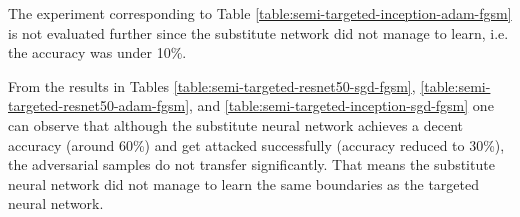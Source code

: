 \begin{table}[]
\caption{Substitute network: InceptionResNetV2 architecture with Adam optimizer; Attack: FGSM}
\label{table:semi-targeted-inception-adam-fgsm}
\end{table}

The experiment corresponding to Table \ref{table:semi-targeted-inception-adam-fgsm} is not evaluated further since the substitute network did not manage to learn, i.e. the accuracy was under 10\%. 

From the results in Tables \ref{table:semi-targeted-resnet50-sgd-fgsm},
\ref{table:semi-targeted-resnet50-adam-fgsm}, and 
\ref{table:semi-targeted-inception-sgd-fgsm} one can observe that although the substitute neural network achieves a decent accuracy (around 60\%) and get attacked successfully (accuracy reduced to 30\%), the adversarial samples do not transfer significantly. That means the substitute neural network did not manage to learn the same boundaries as the targeted neural network. 
